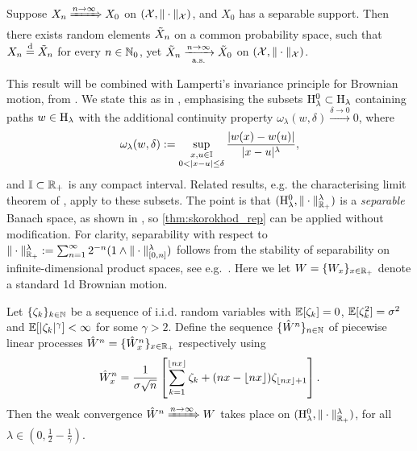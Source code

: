 \begin{theorem}\label{thm:skorokhod_rep}
    Suppose $X_n\xRightarrow{n\to\infty} X_0$ on $(\mathcal{X},\Vert\cdot\Vert_{\mathcal{X}})$, and $X_0$ has a separable support. Then there exists random elements $\tilde{X}_n$ on a common probability space, such that $X_n\stackrel{\mathrm{d}}{=}\tilde{X}_n$ for every $n\in\mathbb{N}_0$, yet $\tilde{X}_n\xrightarrow[\mathrm{a.s.}]{n\to\infty} \tilde{X}_0$ on $(\mathcal{X},\Vert\cdot\Vert_{\mathcal{X}})$.
\end{theorem}

This result will be combined with Lamperti's invariance principle for Brownian motion, from \cite{lamperti_1962}. We state this as in \cite{hamadouche_2000}, emphasising the subsets $\mathrm{H}^0_\lambda\subset\mathrm{H}_\lambda$ containing paths $w\in\mathrm{H}_\lambda$ with the additional continuity property $\omega_\lambda(w,\delta)\xrightarrow{\delta\to0}0$, where
\begin{equation}
    \omega_\lambda(w,\delta) := \sup_{\substack{x,u\in\II \\ 0<|x-u|\le\delta}}\frac{|w(x) - w(u)|}{|x-u|^\lambda},
\end{equation}
and $\mathbb{I}\subset\mathbb{R}_+$ is any compact interval. Related results, e.g. the characterising limit theorem of \cite{rackauskas_2004}, apply to these subsets. The point is that $(\mathrm{H}^0_\lambda,\Vert\cdot\Vert^\lambda_{\mathbb{R}_+})$ is a \emph{separable} Banach space, as shown in \cite{ciesielski_1960}, so \autoref{thm:skorokhod_rep} can be applied without modification. For clarity, separability with respect to $\Vert\cdot\Vert^\lambda_{\mathbb{R}_+}:=\sum_{n=1}^\infty2^{-n}(1\wedge\Vert\cdot\Vert^\lambda_{[0,n]})$ follows from the stability of separability on infinite-dimensional product spaces, see e.g.~\cite{billingsley_1999}. Here we let $W=\{W_x\}_{x\in\mathbb{R}_+}$ denote a standard 1d Brownian motion.

\begin{theorem}\label{thm:lamperti}
    Let $\{\zeta_k\}_{k\in\mathbb{N}}$ be a sequence of i.i.d. random variables with $\mathbb{E}[\zeta_k]=0$, $\mathbb{E}[\zeta^2_k]=\sigma^2$ and $\mathbb{E}[|\zeta_k|^\gamma]<\infty$ for some $\gamma>2$. Define the sequence $\{{\hat{W}}^n\}_{n\in\mathbb{N}}$ of piecewise linear processes ${\hat{W}}^n=\{{\hat{W}}^n_x\}_{x\in\mathbb{R}_+}$ respectively using
    \begin{equation}\label{eq:lamperti_polygon}
        {\hat{W}}^n_x = \frac{1}{\sigma\sqrt{n}}\left[\sum_{k=1}^{\lfloor nx \rfloor}\zeta_k + (nx - \lfloor nx \rfloor)\zeta_{\lfloor nx \rfloor+1}\right].
    \end{equation}
    Then the weak convergence ${\hat{W}}^n\xRightarrow{n\to\infty} W$ takes place on $(\mathrm{H}^0_\lambda,\Vert\cdot\Vert^\lambda_{\mathbb{R}_+})$, for all $\lambda\in(0,\frac12-\frac{1}{\gamma})$.
\end{theorem}


